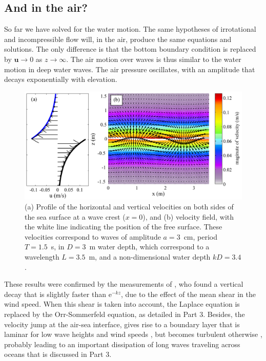 \subsection{And in the air?}
So far we have solved for the water motion. The same hypotheses of irrotational 
and incompressible flow will, in the air, produce the same equations and solutions. 
The only difference is that the bottom boundary condition is replaced by 
${\mathbf u}\rightarrow0$ as $z\rightarrow\infty$.
The air motion over waves is thus similar to the water motion in deep water waves. 
The air pressure oscillates, with an amplitude that decays exponentially 
with elevation. 
\begin{figure}
\centerline{\includegraphics[width=\textwidth]{FIGS_CH_AIRY/vitesse_air_eau_en.pdf}}
  \caption{(a) Profile of the horizontal and vertical velocities on both sides 
of the sea surface at a wave crest ($x=0$), and (b) velocity field, with the white line indicating 
the position of the free surface. These velocities correspond to waves of amplitude $a=3$~cm, 
period $T=1.5$~s, in $D=3$~m water depth, which correspond to a wavelength 
$L=3.5$~m, and a non-dimensional water depth $kD=3.4$. }
\label{vitesse_air_eau}
\end{figure}

These results were confirmed by the measurements of \cite{Elliott1972a}, who 
found a vertical decay that is slightly faster than $\mathrm{e}^{-kz}$, due to 
the effect of the mean shear in the wind speed. When this shear is taken into account, the
Laplace equation is replaced by the Orr-Sommerfeld equation, as detailed in Part 3.
Besides, the velocity jump at the air-sea interface, gives rise to a boundary layer 
that is laminar for low wave heights and wind speeds \citep{Dore1978}, but becomes turbulent 
otherwise \citep{Perignon&al.2014}, probably leading to an important dissipation of long waves traveling across oceans that is 
discussed in Part 3.

